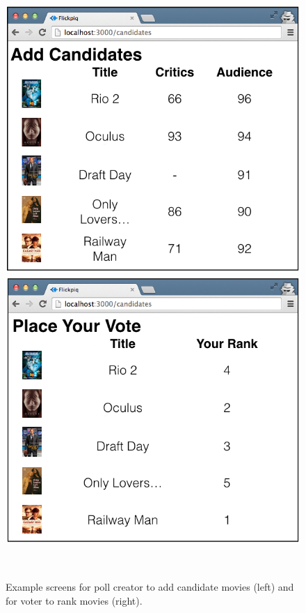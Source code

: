 \documentclass[12pt,letterpaper]{article} %
\begin{document}
\begin{figure}[h!]
 \begin{center}
  \begin{minipage}{0.45\textwidth}
    \begin{center}
      \includegraphics[scale=0.25]{../graphics/add-candidates.png}
    \end{center}
  \end{minipage}
  \hspace{0.05\textwidth}
  \begin{minipage}{0.45\textwidth}
    \begin{center}
      \includegraphics[scale=0.25]{../graphics/place-vote.png}
    \end{center}
  \end{minipage} \\
  \caption{Example screens for poll creator to add candidate movies (left) and for voter to rank movies (right).}
  \label{example-screens}
 \end{center}
\end{figure}
\end{document}
